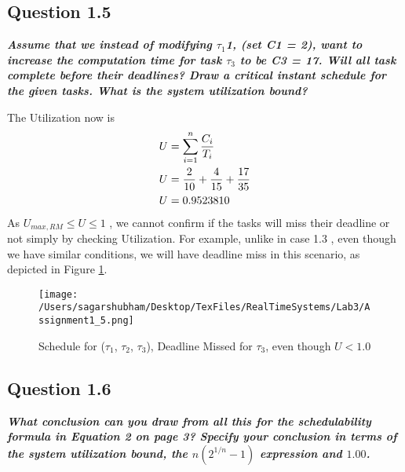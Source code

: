 \documentclass[oneside,a4paper]{article}
\begin{document}
\subsection*{\normalsize{Question 1.5}}
\textit{\textbf{Assume that we instead of modifying $\tau_1$1, (set C1 = 2), want to increase the computation time for task $\tau_3$ to be C3 = 17. Will all task complete before their deadlines? Draw a critical instant schedule for the given tasks. What is the system utilization bound?}}\par
The Utilization now is 
\begin{align*}
& U = \sum_{i=1}^{n} \frac{C_i}{T_i}  \\ 
& U = \frac{2}{10} + \frac{4}{15} + \frac{17}{35}\\
& U = 0.9523810 \hfill\\
\end{align*}
As $U_{max,RM} \leq U \leq 1$ , we cannot confirm if the tasks will miss their deadline or not simply by checking Utilization. For example, unlike in case 1.3 , even though we have similar conditions, we will have deadline miss in this scenario, as depicted in Figure \ref{figure4}.
\begin{figure}[H]
                    \centering
                    \texttt{[image: /Users/sagarshubham/Desktop/TexFiles/RealTimeSystems/Lab3/Assignment1\_5.png]}
                    \caption[Figure for Question 1.5]{Schedule for ($\tau_1$, $\tau_2$, $\tau_3$), Deadline Missed for $\tau_3$, even though $U < 1.0$ }
                    \label{figure4}        
\end{figure}\par
\pagebreak
\subsection*{\normalsize{Question 1.6}}
\textit{\textbf{What conclusion can you draw from all this for the schedulability formula in Equation 2 on page 3? Specify your conclusion in terms of the system utilization bound, the $n(2^{1/n} - 1)$ expression and $1.00$.}}\par
\end{document}
